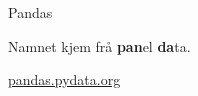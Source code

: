 \begin{frame}{Pandas}

  Namnet kjem frå \textbf{pan}el \textbf{da}ta.
  
	\href{https://pandas.pydata.org/}{pandas.pydata.org}
	
\end{frame}
